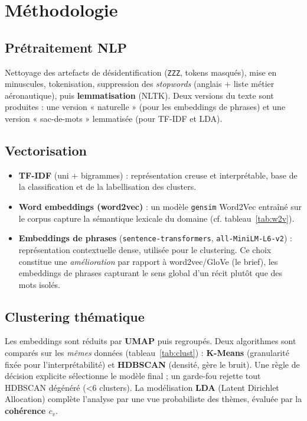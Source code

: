 \documentclass[11pt,a4paper]{article}
\begin{document}
\section{Méthodologie}

\subsection{Prétraitement NLP}
Nettoyage des artefacts de désidentification (\texttt{ZZZ}, tokens masqués),
mise en minuscules, tokenisation, suppression des \emph{stopwords} (anglais +
liste métier aéronautique), puis \textbf{lemmatisation} (NLTK). Deux versions du
texte sont produites : une version « naturelle » (pour les embeddings de phrases)
et une version « sac-de-mots » lemmatisée (pour TF-IDF et LDA).

\subsection{Vectorisation}
\begin{itemize}[leftmargin=1.4em,nosep]
  \item \textbf{TF-IDF} (uni + bigrammes) : représentation creuse et interprétable, base de la classification et de la labellisation des clusters.
  \item \textbf{Word embeddings (word2vec)} : un modèle \texttt{gensim} Word2Vec entraîné sur le corpus capture la sémantique lexicale du domaine (cf. tableau~\ref{tab:w2v}).
  \item \textbf{Embeddings de phrases} (\texttt{sentence-transformers}, \texttt{all-MiniLM-L6-v2}) : représentation contextuelle dense, utilisée pour le clustering. Ce choix constitue une \emph{amélioration} par rapport à word2vec/GloVe (le brief), les embeddings de phrases capturant le sens global d'un récit plutôt que des mots isolés.
\end{itemize}

\subsection{Clustering thématique}
Les embeddings sont réduits par \textbf{UMAP} puis regroupés. Deux algorithmes sont
comparés sur les \emph{mêmes} données (tableau~\ref{tab:clust}) :
\textbf{K-Means} (granularité fixée pour l'interprétabilité) et \textbf{HDBSCAN}
(densité, gère le bruit). Une règle de décision explicite sélectionne le modèle
final ; un garde-fou rejette tout HDBSCAN dégénéré (\textless 6 clusters).
La modélisation \textbf{LDA} (Latent Dirichlet Allocation) complète l'analyse par
une vue probabiliste des thèmes, évaluée par la \textbf{cohérence $c_v$}.
\end{document}
